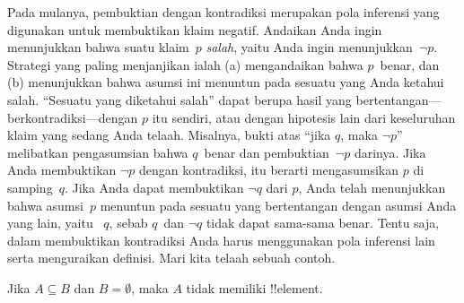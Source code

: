\documentclass[../../../include/open-logic-section]{subfiles}
\begin{document}


Pada mulanya, pembuktian dengan kontradiksi merupakan pola inferensi
yang digunakan untuk membuktikan klaim negatif. Andaikan Anda ingin
menunjukkan bahwa suatu klaim~$p$ \emph{salah}, yaitu Anda ingin
menunjukkan~$\lnot p$. Strategi yang paling menjanjikan ialah (a)
mengandaikan bahwa $p$~benar, dan (b) menunjukkan bahwa asumsi ini
menuntun pada sesuatu yang Anda ketahui salah. ``Sesuatu yang diketahui
salah'' dapat berupa hasil yang bertentangan---berkontradiksi---dengan
$p$ itu sendiri, atau dengan hipotesis lain dari keseluruhan klaim
yang sedang Anda telaah. Misalnya, bukti atas ``jika $q$, maka $\lnot
p$'' melibatkan pengasumsian bahwa $q$~benar dan pembuktian~$\lnot p$
darinya. Jika Anda membuktikan $\lnot p$ dengan kontradiksi, itu
berarti mengasumsikan $p$ di samping~$q$. Jika Anda dapat membuktikan
$\lnot q$ dari $p$, Anda telah menunjukkan bahwa asumsi~$p$ menuntun
pada sesuatu yang bertentangan dengan asumsi Anda yang lain, yaitu
~$q$, sebab $q$~dan $\lnot q$ tidak dapat sama-sama benar. Tentu saja,
dalam membuktikan kontradiksi Anda harus menggunakan pola inferensi
lain serta menguraikan definisi. Mari kita telaah sebuah contoh.

\begin{prop}
  Jika $A \subseteq B$ dan $B = \emptyset$, maka $A$ tidak memiliki
  !!{element}.
\end{prop}
\end{document}
